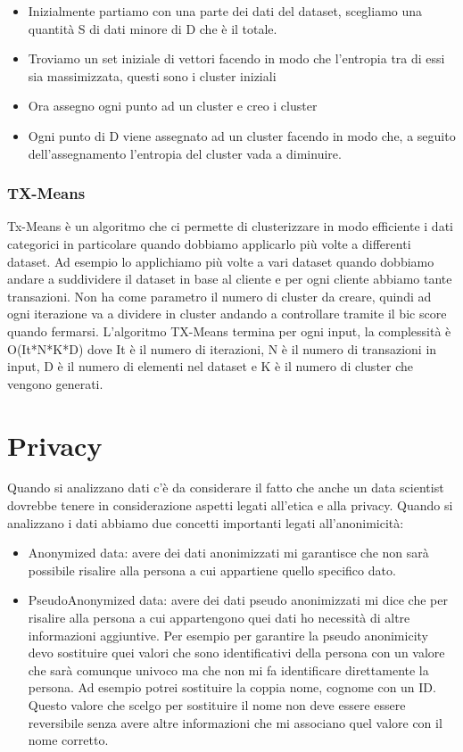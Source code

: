 \documentclass[14pt]{extreport}
\begin{document}
\begin{itemize}
    \item Inizialmente partiamo con una parte dei dati del dataset, scegliamo una quantità S di dati minore di D che è il totale.
    \item Troviamo un set iniziale di vettori facendo in modo che l'entropia tra di essi sia massimizzata, questi sono i cluster iniziali
    \item Ora assegno ogni punto ad un cluster e creo i cluster
    \item Ogni punto di D viene assegnato ad un cluster facendo in modo che, a seguito dell'assegnamento l'entropia del cluster vada a diminuire.
\end{itemize}

\subsection{TX-Means}

Tx-Means è un algoritmo che ci permette di clusterizzare in modo efficiente i dati categorici in particolare quando dobbiamo applicarlo più volte a differenti dataset. Ad esempio lo applichiamo più volte a vari dataset quando dobbiamo andare a suddividere il dataset in base al cliente e per ogni cliente abbiamo tante transazioni.
Non ha come parametro il numero di cluster da creare, quindi ad ogni iterazione va a dividere in cluster andando a controllare tramite il bic score quando fermarsi.
L'algoritmo TX-Means termina per ogni input, la complessità è O(It*N*K*D) dove It è il numero di iterazioni, N è il numero di transazioni in input, D è il numero di elementi nel dataset e K è il numero di cluster che vengono generati.

\chapter{Privacy}

Quando si analizzano dati c'è da considerare il fatto che anche un data scientist dovrebbe tenere in considerazione aspetti legati all'etica e alla privacy.
Quando si analizzano i dati abbiamo due concetti importanti legati all'anonimicità:
\begin{itemize}
\item Anonymized data: avere dei dati anonimizzati mi garantisce che non sarà possibile risalire alla persona a cui appartiene quello specifico dato.
\item PseudoAnonymized data: avere dei dati pseudo anonimizzati mi dice che per risalire alla persona a cui appartengono quei dati ho necessità di altre informazioni aggiuntive.
Per esempio per garantire la pseudo anonimicity devo sostituire quei valori che sono identificativi della persona con un valore che sarà comunque univoco ma che non mi fa identificare direttamente la persona. Ad esempio potrei sostituire la coppia nome, cognome con un ID. Questo valore che scelgo per sostituire il nome non deve essere essere reversibile senza avere altre informazioni che mi associano quel valore con il nome corretto.
\end{itemize}
\end{document}
